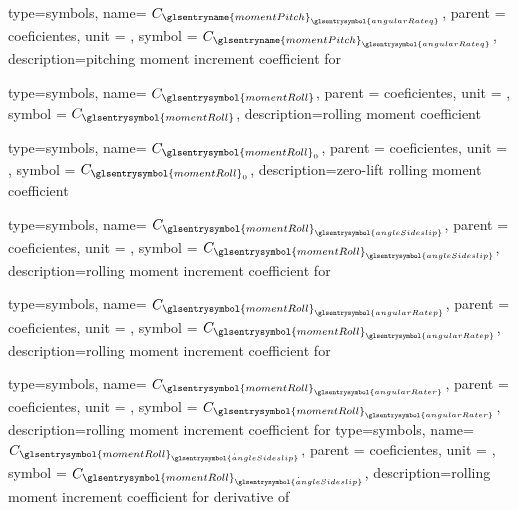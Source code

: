 {type=symbols,
    name= \ensuremath{C_{{\glsentryname{momentPitch}}_{\glsentrysymbol{angularRateq}}}},
    parent = {coeficientes},
    unit = \unexpanded{},
    symbol = \ensuremath{C_{{\glsentryname{momentPitch}}_{\glsentrysymbol{angularRateq}}}},
    description={pitching moment increment coefficient for }
}

{type=symbols,
    name= \ensuremath{C_{\glsentrysymbol{momentRoll}}},
    parent = {coeficientes},
    unit = \unexpanded{},
    symbol = \ensuremath{C_{\glsentrysymbol{momentRoll}}},
    description={rolling moment coefficient}
}

{type=symbols,
    name= \ensuremath{C_{\glsentrysymbol{momentRoll}_{0}}},
    parent = {coeficientes},
    unit = \unexpanded{},
    symbol = \ensuremath{C_{\glsentrysymbol{momentRoll}_{0}}},
    description={zero-lift rolling moment coefficient}
}

{type=symbols,
    name= \ensuremath{C_{{\glsentrysymbol{momentRoll}}_{\glsentrysymbol{angleSideslip}}}},
    parent = {coeficientes},
    unit = \unexpanded{},
    symbol = \ensuremath{C_{{\glsentrysymbol{momentRoll}}_{\glsentrysymbol{angleSideslip}}}},
    description={rolling moment increment coefficient for }
}

{type=symbols,
    name= \ensuremath{C_{{\glsentrysymbol{momentRoll}}_{\glsentrysymbol{angularRatep}}}},
    parent = {coeficientes},
    unit = \unexpanded{},
    symbol = \ensuremath{C_{{\glsentrysymbol{momentRoll}}_{\glsentrysymbol{angularRatep}}}},
    description={rolling moment increment coefficient for }
}

{type=symbols,
    name= \ensuremath{C_{{\glsentrysymbol{momentRoll}}_{\glsentrysymbol{angularRater}}}},
    parent = {coeficientes},
    unit = \unexpanded{},
    symbol = \ensuremath{C_{{\glsentrysymbol{momentRoll}}_{\glsentrysymbol{angularRater}}}},
    description={rolling moment increment coefficient for }
}
{type=symbols,
    name= \ensuremath{C_{{\glsentrysymbol{momentRoll}}_{\dot{\glsentrysymbol{angleSideslip}}}}},
    parent = {coeficientes},
    unit = \unexpanded{},
    symbol = \ensuremath{C_{{\glsentrysymbol{momentRoll}}_{\dot{\glsentrysymbol{angleSideslip}}}}},
    description={rolling moment increment coefficient for derivative of }
}



